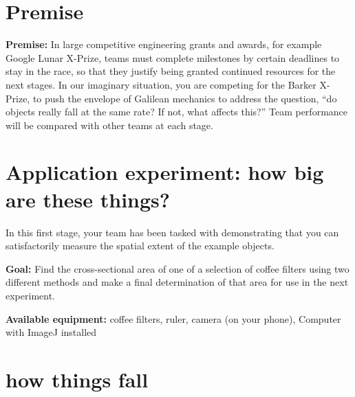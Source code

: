 
\section*{Premise}

\textbf{Premise:} In large competitive engineering grants and awards, for example Google Lunar X-Prize, teams must complete milestones by certain deadlines to stay in the race, so that they justify being granted continued resources for the next stages. In our imaginary situation, you are competing for the Barker X-Prize, to push the envelope of Galilean mechanics to address the question, ``do objects really fall at the same rate? If not, what affects this?'' Team performance will be compared with other teams at each stage.

\section{Application experiment: how big are these things?}

In this first stage, your team has been tasked with demonstrating that you can satisfactorily measure the spatial extent of the example objects.

\textbf{Goal:} Find the cross-sectional area of one of a selection of coffee filters using two different methods and make a final determination of that area for use in the next experiment.
 
\textbf{Available equipment:} coffee filters, ruler, camera (on your phone), Computer with ImageJ installed


 
\section{how things fall}

